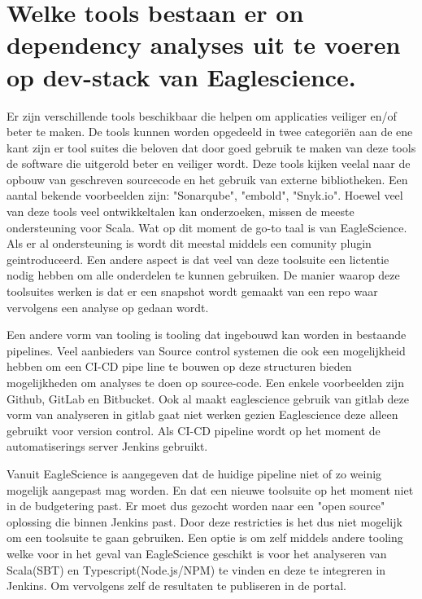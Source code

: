 \section{Welke tools bestaan er on dependency analyses uit te voeren op dev-stack van Eaglescience.}\label{sec:welke-tools-bestaan-er-on-dependency-analyses-uit-te-voeren-op-dev-stack-van-eaglescience.}
Er zijn verschillende tools beschikbaar die helpen om applicaties veiliger en/of beter te maken. De tools kunnen worden opgedeeld in twee categoriën aan de ene kant zijn er tool suites die beloven dat door goed gebruik te maken van deze tools de software die uitgerold beter en veiliger wordt. Deze tools kijken veelal naar de opbouw van geschreven sourcecode en het gebruik van externe bibliotheken. Een aantal bekende voorbeelden zijn: "Sonarqube", "embold", "Snyk.io". Hoewel veel van deze tools veel ontwikkeltalen kan onderzoeken, missen de meeste ondersteuning voor Scala. Wat op dit moment de go-to taal is van EagleScience. Als er al ondersteuning is wordt dit meestal middels een comunity plugin geintroduceerd. Een andere aspect is dat veel van deze toolsuite een lictentie nodig hebben om alle onderdelen te kunnen gebruiken. De manier waarop deze toolsuites werken is dat er een snapshot wordt gemaakt van een repo waar vervolgens een analyse op gedaan wordt.

Een andere vorm van tooling is tooling dat ingebouwd kan worden in bestaande pipelines. Veel aanbieders van Source control systemen die ook een mogelijkheid hebben om een CI-CD pipe line te bouwen op deze structuren bieden mogelijkheden om analyses te doen op source-code. Een enkele voorbeelden zijn Github, GitLab en Bitbucket. Ook al maakt eaglescience gebruik van gitlab deze vorm van analyseren in gitlab gaat niet werken gezien Eaglescience deze alleen gebruikt voor version control. Als CI-CD pipeline wordt op het moment de automatiserings server Jenkins gebruikt.

Vanuit EagleScience is aangegeven dat de huidige pipeline niet of zo weinig mogelijk aangepast mag worden. En dat een nieuwe toolsuite op het moment niet in de budgetering past. Er moet dus gezocht worden naar een "open source" oplossing die binnen Jenkins past. Door deze restricties is het dus niet mogelijk om een toolsuite te gaan gebruiken. Een optie is om zelf middels andere tooling welke voor in het geval van EagleScience geschikt is voor het analyseren van Scala(SBT) en Typescript(Node.js/NPM) te vinden en deze te integreren in Jenkins. Om vervolgens zelf de resultaten te publiseren in de portal.


